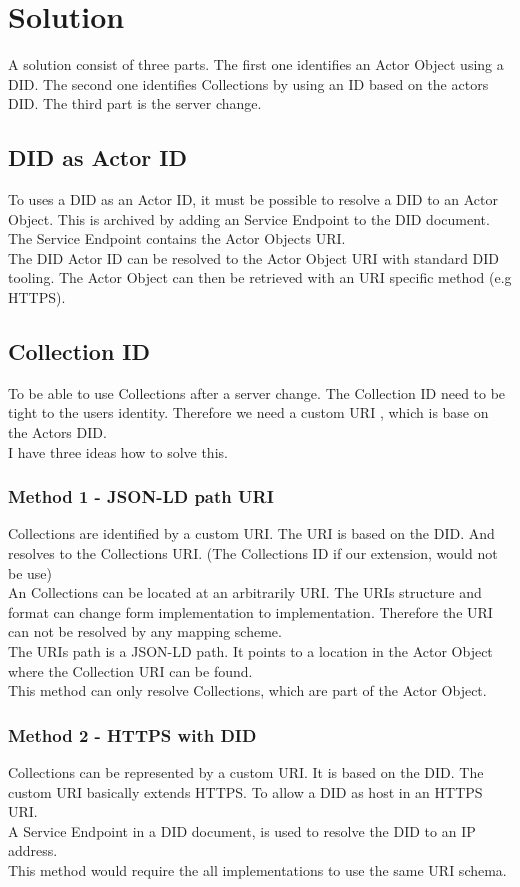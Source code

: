 \documentclass[conference]{IEEEtran}
\begin{document}
\section{Solution}
A solution consist of three parts. The first one identifies an Actor Object using a DID. The second one identifies Collections by using an ID based on the actors DID. The third part is the server change.
\subsection{DID as Actor ID}
To uses a DID as an Actor ID, it must be possible to resolve a DID to an Actor Object. This is archived by adding an Service Endpoint to the DID document. The Service Endpoint contains the Actor Objects URI.\\
The DID Actor ID can be resolved to the Actor Object URI with standard DID tooling. The Actor Object can then be retrieved with an URI specific method (e.g HTTPS).
\subsection{Collection ID}
To be able to use Collections after a server change. The Collection ID need to be tight to the users identity. Therefore we need a custom URI , which is base on the Actors DID.\\
I have three ideas how to solve this. 
\subsubsection{Method 1 - JSON-LD path URI}
Collections are identified by a custom URI. The URI is based on the DID. And resolves to the Collections URI. (The Collections ID if our extension, would not be use) \\
An Collections can be located at an arbitrarily URI. The URIs structure and format can change form implementation to implementation. Therefore the URI can not be resolved by any mapping scheme.\\
The URIs path is a JSON-LD path. It points to a location in the Actor Object where the Collection URI can be found.\\
This method can only resolve Collections, which are part of the Actor Object.
\subsubsection{Method 2 - HTTPS with DID}
Collections can be represented by a custom URI. It is based on the DID. The custom URI basically extends HTTPS. To allow a DID as host in an HTTPS URI.\\
A Service Endpoint in a DID document, is used to resolve the DID to an IP address.\\
This method would require the all implementations to use the same URI schema.
\end{document}
